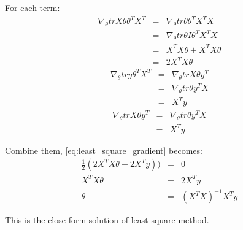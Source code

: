\documentclass[a4paper]{article}
\newcommand{\qed}{\nobreak \ifvmode \relax \else
      \ifdim\lastskip<1.5em \hskip-\lastskip
      \hskip1.5em plus0em minus0.5em \fi \nobreak
      \vrule height0.75em width0.5em depth0.25em\fi}
\begin{document}
For each term:
\begin{eqnarray}
	\nabla_\theta trX\theta\theta^T X^T &=& \nabla_\theta tr\theta\theta^T X^TX \nonumber \\
	&=& \nabla_\theta tr\theta I\theta^T X^TX \nonumber \\
	&=& X^TX\theta + X^TX\theta \nonumber \\
	&=& 2X^TX\theta \nonumber
\end{eqnarray}
\begin{eqnarray}
	\nabla_\theta try\theta^TX^T &=& \nabla_\theta trX\theta y^T \nonumber \\
	&=& \nabla_\theta tr\theta y^TX \nonumber \\
	&=& X^Ty \nonumber
\end{eqnarray}
\begin{eqnarray}
	\nabla_\theta trX\theta y^T &=& \nabla_\theta tr\theta y^TX \nonumber \\
	&=& X^Ty \nonumber
\end{eqnarray}

Combine them, \cref{eq:least_square_gradient} becomes:
\begin{eqnarray}
	\frac{1}{2}(2X^TX\theta - 2X^Ty)) &=& 0 \nonumber\\
	X^TX\theta &=& 2X^Ty \nonumber\\
	\theta &=& (X^TX)^{-1}X^Ty \nonumber
\end{eqnarray}

This is the close form solution of least square method. \qed
\end{document}

